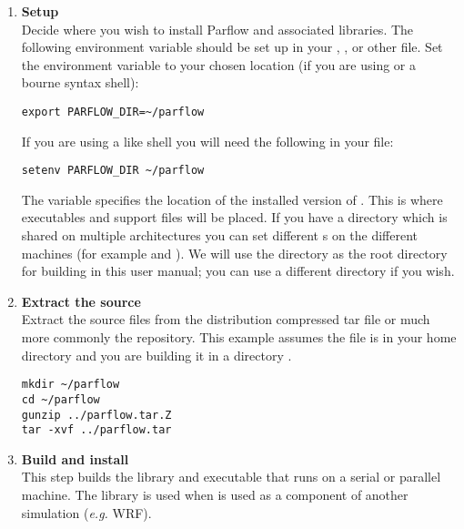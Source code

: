 \begin{enumerate}
\item {\bf Setup} \\ Decide where you wish to install Parflow and
  associated libraries. The following environment variable should be
  set up in your , , or other file. Set
  the environment variable  to your chosen location
  (if you are using  or a bourne syntax shell):
\begin{display}\begin{verbatim}
export PARFLOW_DIR=~/parflow
\end{verbatim}\end{display}
If you are using a  like shell you will need the following in your
 file:
\begin{display}\begin{verbatim}
setenv PARFLOW_DIR ~/parflow
\end{verbatim}\end{display}

The variable  specifies the location of the
installed version of \parflow{}. This is where executables and support
files will be placed.  If you have a directory which is shared on
multiple architectures you can set different s on
the different machines (for example  and
).  We will use the  directory as
the root directory for building \parflow{} in this user manual; you
can use a different directory if you wish.



\item {\bf Extract the source}\\
Extract the source files from the distribution compressed tar file or much more commonly
the  repository.
This example assumes the  file is in your home directory
and you are building it in a directory .

\begin{display}\begin{verbatim}
mkdir ~/parflow
cd ~/parflow
gunzip ../parflow.tar.Z 
tar -xvf ../parflow.tar
\end{verbatim}\end{display}


\item {\bf Build and install \parflow{}}\\ 
This step builds the \parflow{} library and executable that runs on
a serial or parallel machine.  The library is used when
 \parflow{} is used as a component of another simulation (\emph{e.g.}
 WRF).  


\end{enumerate}
